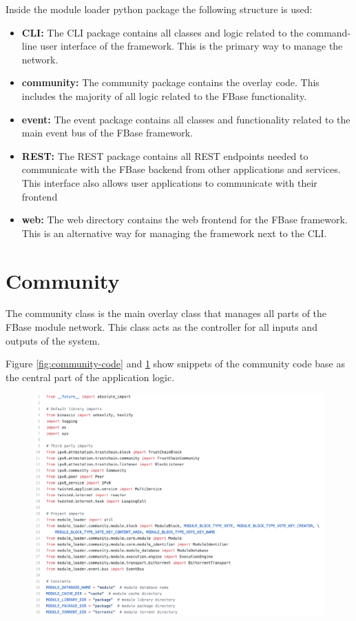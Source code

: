 Inside the module loader python package the following structure is used:

\begin{itemize}
	\item \textbf{CLI:} The CLI package contains all classes and logic related to the command-line user interface of the framework. This is the primary way to manage the network.
	\item \textbf{community:} The community package contains the overlay code. This includes the majority of all logic related to the FBase functionality.
	\item \textbf{event:} The event package contains all classes and functionality related to the main event bus of the FBase framework.
	\item \textbf{REST:} The REST package contains all REST endpoints needed to communicate with the FBase backend from other applications and services. This interface also allows user applications to communicate with their frontend
	\item \textbf{web:} The web directory contains the web frontend for the FBase framework. This is an alternative way for managing the framework next to the CLI.
\end{itemize}

\section{Community}

The community class is the main overlay class that manages all parts of the FBase module network. This class acts as the controller for all inputs and outputs of the system.

Figure \ref{fig:community-code} and \ref{fig:community-code-imports} show snippets of the community code base as the central part of the application logic.

\begin{figure}[h!]
	\centering
	\includegraphics[width=\textwidth]{images/code-community-imports.png}
	\caption{\label{fig:community-code-imports}}
\end{figure}

